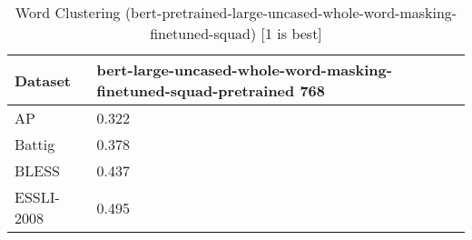 \begin{table}[]
\centering
\begin{tabular}{l|l}
\hline
Dataset & bert-large-uncased-whole-word-masking-finetuned-squad-pretrained 768 \\
\hline
AP & 0.322 \\ 
Battig & 0.378 \\ 
BLESS & 0.437 \\ 
ESSLI-2008 & 0.495
\end{tabular}
\caption{Word Clustering (bert-pretrained-large-uncased-whole-word-masking-finetuned-squad) [1 is best]}
\label{tab:cluster-bert-pretrained-large-uncased-whole-word-masking-finetuned-squad}
\end{table}
